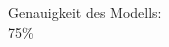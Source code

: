 \documentclass[preview]{standalone}
\begin{document}
\begin{center}
Genauigkeit des Modells: \\75\%
\end{center}
\end{document}
